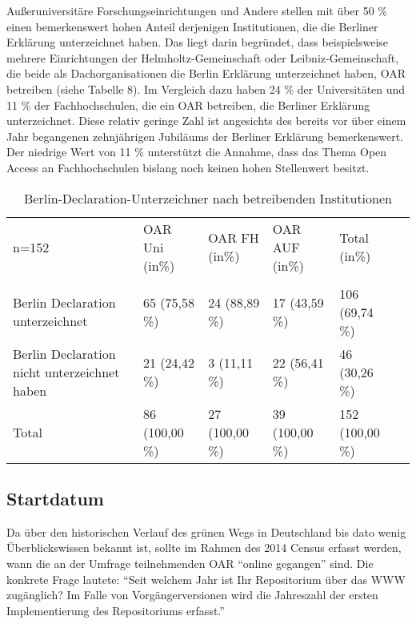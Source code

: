 \documentclass[a4paper,
fontsize=11pt,
oneside,
numbers=noperiodatend,
parskip=half-,
bibliography=totoc,
final
]{scrartcl}
\begin{document}
Außeruniversitäre Forschungseinrichtungen und Andere stellen mit über 50
\% einen bemerkenswert hohen Anteil derjenigen Institutionen, die die
Berliner Erklärung unterzeichnet haben. Das liegt darin begründet, dass
beispielsweise mehrere Einrichtungen der Helmholtz-Gemeinschaft oder
Leibniz-Gemeinschaft, die beide als Dachorganisationen die Berlin
Erklärung unterzeichnet haben, OAR betreiben (siehe Tabelle 8). Im
Vergleich dazu haben 24 \% der Universitäten und 11 \% der
Fachhochschulen, die ein OAR betreiben, die Berliner Erklärung
unterzeichnet. Diese relativ geringe Zahl ist angesichts des bereits vor
über einem Jahr begangenen zehnjährigen Jubiläums der Berliner Erklärung
bemerkenswert. Der niedrige Wert von 11 \% unterstützt die Annahme, dass
das Thema Open Access an Fachhochschulen bislang noch keinen hohen
Stellenwert besitzt.

\begin{table}[ht]
\centering
\begin{tabular}{p{3cm} lllll}
  \toprule
n=152 & OAR Uni (in\%)   & OAR FH (in\%)  & OAR AUF (in\%)  & Total (in\%) \\  
\cmidrule(r){1-1} \cmidrule(r){2-2} \cmidrule(r){3-3} \cmidrule(r){4-4} \cmidrule(r){5-5} \\ 
 Berlin Declaration unterzeichnet & 65 (75,58 \%) & 24 (88,89 \%) & 17 (43,59 \%) & 106 (69,74 \%) \\ 
Berlin Declaration nicht unterzeichnet haben & 21 (24,42 \%) & 3 (11,11 \%) & 22 (56,41 \%) & 46 (30,26 \%)  \\ 
\cmidrule(r){1-1} \cmidrule(r){2-2} \cmidrule(r){3-3} \cmidrule(r){4-4} \cmidrule(r){5-5}  
Total & 86 (100,00 \%) & 27 (100,00 \%) & 39 (100,00 \%) & 152 (100,00 \%) \\
\bottomrule
  \end{tabular}
  \caption{Berlin-Declaration-Unterzeichner nach betreibenden
Institutionen}
\end{table}

\subsection*{Startdatum}\label{Startdatum}

Da über den historischen Verlauf des grünen Wegs in Deutschland bis dato
wenig Überblickswissen bekannt ist, sollte im Rahmen des 2014 Census
erfasst werden, wann die an der Umfrage teilnehmenden OAR
\enquote{online gegangen} sind. Die konkrete Frage lautete:
\enquote{Seit welchem Jahr ist Ihr Repositorium über das WWW zugänglich?
Im Falle von Vorgängerversionen wird die Jahreszahl der ersten
Implementierung des Repositoriums erfasst.}
\end{document}

